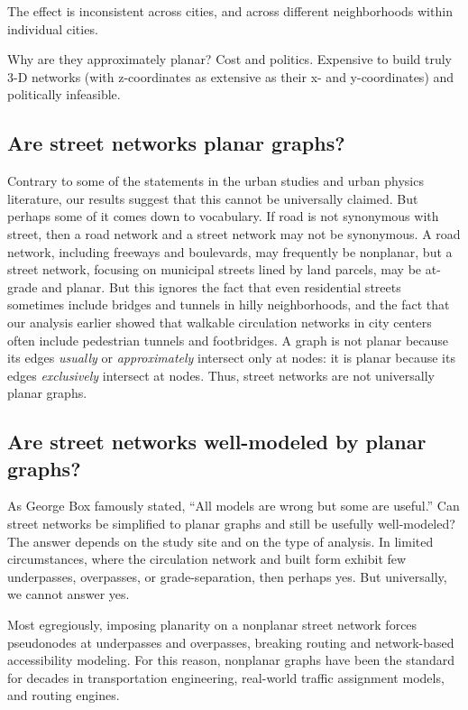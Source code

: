 \documentclass[Afour,sageh,times]{sagej}
\begin{document}
The effect is inconsistent across cities, and across different neighborhoods within individual cities.

Why are they approximately planar? Cost and politics. Expensive to build truly 3-D networks (with z-coordinates as extensive as their x- and y-coordinates) and politically infeasible.

\subsection{Are street networks planar graphs?}

Contrary to some of the statements in the urban studies and urban physics literature, our results suggest that this cannot be universally claimed. But perhaps some of it comes down to vocabulary. If road is not synonymous with street, then a road network and a street network may not be synonymous. A road network, including freeways and boulevards, may frequently be nonplanar, but a street network, focusing on municipal streets lined by land parcels, may be at-grade and planar. But this ignores the fact that even residential streets sometimes include bridges and tunnels in hilly neighborhoods, and the fact that our analysis earlier showed that walkable circulation networks in city centers often include pedestrian tunnels and footbridges. A graph is not planar because its edges \emph{usually} or \emph{approximately} intersect only at nodes: it is planar because its edges \emph{exclusively} intersect at nodes. Thus, street networks are not universally planar graphs. 

\subsection{Are street networks well-modeled by planar graphs?}

As George Box famously stated, \enquote{All models are wrong but some are useful.} Can street networks be simplified to planar graphs and still be usefully well-modeled? The answer depends on the study site and on the type of analysis. In limited circumstances, where the circulation network and built form exhibit few underpasses, overpasses, or grade-separation, then perhaps yes. But universally, we cannot answer yes.

Most egregiously, imposing planarity on a nonplanar street network forces pseudonodes at underpasses and overpasses, breaking routing and network-based accessibility modeling. For this reason, nonplanar graphs have been the standard for decades in transportation engineering, real-world traffic assignment models, and routing engines.
\end{document}
